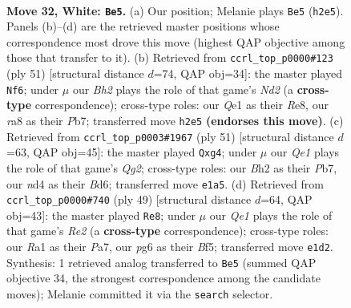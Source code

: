 \documentclass[11pt]{article}
\begin{document}
\clearpage

\begin{figure}[p]\centering
\begin{subfigure}{0.46\textwidth}\centering
\resizebox{\linewidth}{!}{%
\newchessgame
\chessboard[
  setfen={r5k1/1p3pb1/5qp1/p2p4/3n3p/7P/P4PPB/RN1nQK2 w - - 0 32},
  showmover=false,
  pgfstyle=straightmove, color=movearrow, markmove={h2-e5}
]}
\caption{}
\end{subfigure}\hfill
\begin{subfigure}{0.46\textwidth}\centering
\resizebox{\linewidth}{!}{%
\newchessgame
\chessboard[
  setfen={4r1k1/pp1nqpp1/2p4p/8/8/PQ2P1PP/1P3PB1/3R2K1 b - - 2 26},
  showmover=false,
  pgfstyle=straightmove, color=movearrow, markmove={d7-f6}
]}
\caption{}
\end{subfigure}
\\[4pt]
\begin{subfigure}{0.46\textwidth}\centering
\resizebox{\linewidth}{!}{%
\newchessgame
\chessboard[
  setfen={2k3r1/ppp3q1/3bp2p/8/4P1N1/1QP2N2/PP3PP1/3R1K2 b - - 0 26},
  showmover=false,
  pgfstyle=straightmove, color=movearrow, markmove={g7-g4}
]}
\caption{}
\end{subfigure}\hfill
\begin{subfigure}{0.46\textwidth}\centering
\resizebox{\linewidth}{!}{%
\newchessgame
\chessboard[
  setfen={6k1/ppq1rpp1/5n1p/2P1Nb2/3Q1P2/5B1P/P5P1/2R3K1 b - - 0 25},
  showmover=false,
  pgfstyle=straightmove, color=movearrow, markmove={e7-e8}
]}
\caption{}
\end{subfigure}
\caption{\textbf{Move 32, White: \texttt{Be5}.} (a) Our position; Melanie plays \texttt{Be5} (\texttt{h2e5}). Panels (b)--(d) are the retrieved master positions whose correspondence most drove this move (highest QAP objective among those that transfer to it). (b) Retrieved from \texttt{ccrl\_top\_p0000\#123} (ply 51) [structural distance $d$=74, QAP obj=34]: the master played \texttt{Nf6}; under $\mu$ our \emph{Bh2} plays the role of that game's \emph{Nd2} (a \textbf{cross-type} correspondence); cross-type roles: our \emph{Q}e1 as their \emph{R}e8, our \emph{r}a8 as their \emph{P}b7; transferred move \texttt{h2e5} \textbf{(endorses this move)}. (c) Retrieved from \texttt{ccrl\_top\_p0003\#1967} (ply 51) [structural distance $d$=63, QAP obj=45]: the master played \texttt{Qxg4}; under $\mu$ our \emph{Qe1} plays the role of that game's \emph{Qg2}; cross-type roles: our \emph{B}h2 as their \emph{P}b7, our \emph{n}d4 as their \emph{B}d6; transferred move \texttt{e1a5}. (d) Retrieved from \texttt{ccrl\_top\_p0000\#740} (ply 49) [structural distance $d$=64, QAP obj=43]: the master played \texttt{Re8}; under $\mu$ our \emph{Qe1} plays the role of that game's \emph{Re2} (a \textbf{cross-type} correspondence); cross-type roles: our \emph{R}a1 as their \emph{P}a7, our \emph{p}g6 as their \emph{B}f5; transferred move \texttt{e1d2}. Synthesis: 1 retrieved analog transferred to \texttt{Be5} (summed QAP objective 34, the strongest correspondence among the candidate moves); Melanie committed it via the \texttt{search} selector.}
\label{fig:thought-m62}
\end{figure}
\end{document}
